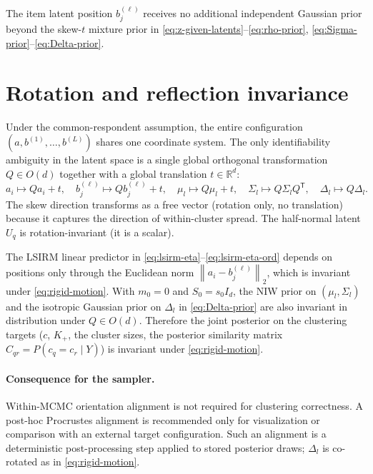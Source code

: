 \documentclass[11pt]{article}
\newcommand{\R}{\mathbb R}
\newcommand{\norm}[1]{\left\lVert #1 \right\rVert}
\newcommand{\trans}{^{\mathsf T}}
\begin{document}
The item latent position $b_j^{(\ell)}$ receives no additional independent
Gaussian prior beyond the skew-$t$ mixture prior in
\eqref{eq:z-given-latents}--\eqref{eq:rho-prior},
\eqref{eq:Sigma-prior}--\eqref{eq:Delta-prior}.

\section{Rotation and reflection invariance}
\label{sec:rotation-invariance}

Under the common-respondent assumption, the entire configuration
$(a,b^{(1)},\dots,b^{(L)})$ shares one coordinate system.  The only
identifiability ambiguity in the latent space is a single global orthogonal
transformation $Q\in O(d)$ together with a global translation $t\in\R^d$:
\begin{equation}
    a_i\mapsto Qa_i+t,
    \quad
    b_j^{(\ell)}\mapsto Qb_j^{(\ell)}+t,
    \quad
    \mu_l\mapsto Q\mu_l+t,
    \quad
    \Sigma_l\mapsto Q\Sigma_l Q\trans,
    \quad
    \Delta_l\mapsto Q\Delta_l.
    \label{eq:rigid-motion}
\end{equation}
The skew direction transforms as a free vector (rotation only, no
translation) because it captures the direction of within-cluster spread.
The half-normal latent $U_q$ is rotation-invariant (it is a scalar).

The LSIRM linear predictor in \eqref{eq:lsirm-eta}--\eqref{eq:lsirm-eta-ord}
depends on positions only through the Euclidean norm
$\norm{a_i-b_j^{(\ell)}}_2$, which is invariant under
\eqref{eq:rigid-motion}.  With $m_0=0$ and $S_0=s_0 I_d$, the NIW prior on
$(\mu_l,\Sigma_l)$ and the isotropic Gaussian prior on $\Delta_l$ in
\eqref{eq:Delta-prior} are also invariant in distribution under
$Q\in O(d)$.  Therefore the joint posterior on the clustering targets
($c$, $K_+$, the cluster sizes, the posterior similarity matrix
$C_{qr}=P(c_q=c_r\mid Y)$) is invariant under \eqref{eq:rigid-motion}.

\paragraph{Consequence for the sampler.}
Within-MCMC orientation alignment is not required for clustering
correctness.  A post-hoc Procrustes alignment is recommended only for
visualization or comparison with an external target configuration.  Such an
alignment is a deterministic post-processing step applied to stored
posterior draws; $\Delta_l$ is co-rotated as in \eqref{eq:rigid-motion}.
\end{document}
